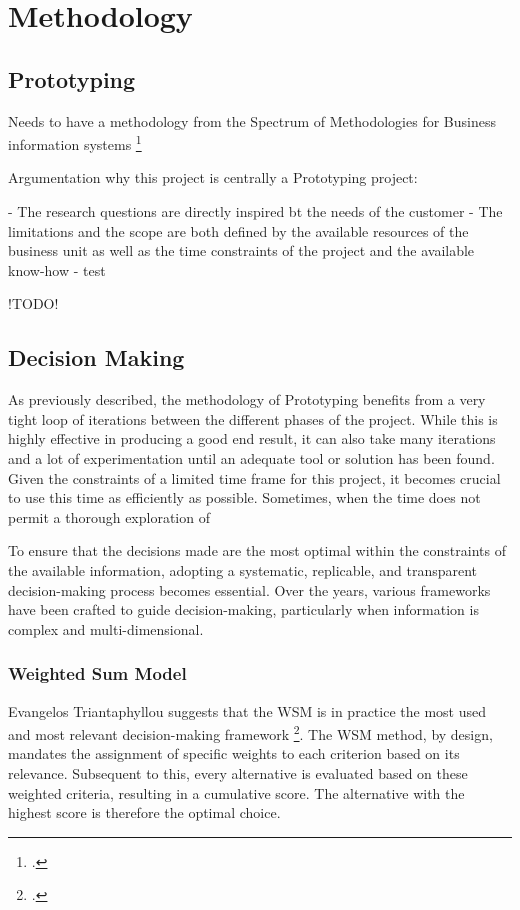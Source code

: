 \chapter{Methodology}
\label{methodology}

\section{Prototyping}

Needs to have a methodology from the Spectrum of Methodologies for Business information systems \footcite{wildeMethodenspektrumWirtschaftsinformatikUeberblick}


Argumentation why this project is centrally a Prototyping project:

 - The research questions are directly inspired bt the needs of the customer
 - The limitations and the scope are both defined by the available resources of the business unit as well as the time constraints of the project
         and the available know-how
 -  test

 !TODO!

\newpage


\section{Decision Making}
\label{decision_making}

As previously described, the methodology of Prototyping benefits from a very tight loop of iterations between the different phases of the project.
While this is highly effective in producing a good end result, it can also take many iterations and a lot of experimentation until an adequate tool or solution has been found.
Given the constraints of a limited time frame for this project, it becomes crucial to use this time as efficiently as possible.
Sometimes, when the time does not permit a thorough exploration of 

To ensure that the decisions made are the most optimal within the constraints of the available information, adopting a systematic, replicable, and transparent decision-making process becomes essential. Over the years, various frameworks have been crafted to guide decision-making, 
particularly when information is complex and multi-dimensional.

\subsection{Weighted Sum Model}
Evangelos Triantaphyllou suggests that the \ac{WSM} is in practice the most used and most relevant decision-making framework \footcite[p. 1]{triantaphyllouIntroductionMultiCriteriaDecision2000}.
The \ac{WSM} method, by design, mandates the assignment of specific weights to each criterion based on its relevance. Subsequent to this, every alternative is evaluated based on these weighted criteria, resulting in a cumulative score.
The alternative with the highest score is therefore the optimal choice.


